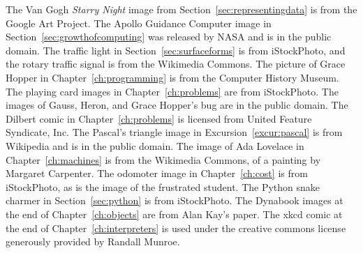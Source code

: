 \documentclass[10pt]{book}
\begin{document}
The Van Gogh \emph{Starry Night} image from Section~\ref{sec:representingdata} is from the Google Art Project.  The Apollo Guidance Computer image in Section~\ref{sec:growthofcomputing} was released by NASA and is in the public domain.  The traffic light in Section~\ref{sec:surfaceforms} is from iStockPhoto, and the rotary traffic signal is from the Wikimedia Commons.   The picture of Grace Hopper in Chapter~\ref{ch:programming} is from the Computer History Museum.  The playing card images in Chapter~\ref{ch:problems} are from iStockPhoto.  The images of Gauss, Heron, and Grace Hopper's bug are in the public domain.  The Dilbert comic in Chapter~\ref{ch:problems} is licensed from United Feature Syndicate, Inc.  The Pascal's triangle image in Excursion~\ref{excur:pascal} is from Wikipedia and is in the public domain.  The image of Ada Lovelace in Chapter~\ref{ch:machines} is from the Wikimedia Commons, of a painting by Margaret Carpenter.  The odomoter image in Chapter~\ref{ch:cost} is from iStockPhoto, as is the image of the frustrated student.  The Python snake charmer in Section~\ref{sec:python} is from iStockPhoto.  The Dynabook images at the end of Chapter~\ref{ch:objects} are from Alan Kay's paper.  The xkcd comic at the end of Chapter~\ref{ch:interpreters} is used under the creative commons license generously provided by Randall Munroe. 



\mainmatter

\pagestyle{fancy}
\fancyhead{}
\fancyhead[RE]{\nouppercase{\bfseries \rightmark}} 
\fancyhead[LO]{\nouppercase{\bfseries \leftmark}} 
\fancyhead[LE,RO]{\thepage}

\fancyfoot{}
\renewcommand{\headrulewidth}{0.4pt}

\fancypagestyle{plain}{
  \fancyhf{} 
  \renewcommand{\headrulewidth}{0pt}
  \renewcommand{\footrulewidth}{0pt}
}

\end{document}
